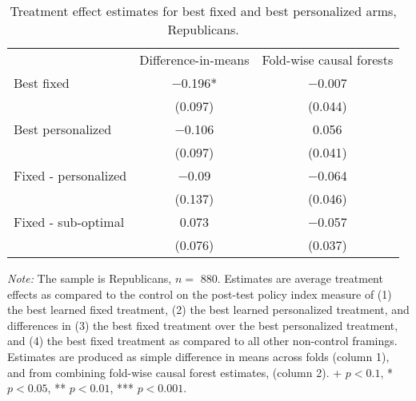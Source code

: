 \begin{table*}

\caption{Treatment effect estimates for best fixed and best personalized arms, Republicans. \label{tab:best_framing_republicans}}
\centering
\begin{threeparttable}
\begin{tabular}[t]{lcc}
\toprule
 & Difference-in-means & Fold-wise causal forests\\
\cmidrule(lr){2-2} \cmidrule(lr){3-3}
Best fixed & \num{-0.196}* & \num{-0.007}\\
 & (\num{0.097}) & (\num{0.044})\\
\addlinespace
Best personalized & \num{-0.106} & \num{0.056}\\
 & (\num{0.097}) & (\num{0.041})\\
\cmidrule(lr){2-2} \cmidrule(lr){3-3}
\addlinespace
Fixed - personalized & \num{-0.09} & \num{-0.064}\\
 & (\num{0.137}) & (\num{0.046})\\
\addlinespace
Fixed - sub-optimal & \num{0.073} & \num{-0.057}\\
 & (\num{0.076}) & (\num{0.037})\\
\bottomrule
\end{tabular}
\begin{tablenotes}
\item \footnotesize \textit{Note:} The sample is Republicans, $n = $ \num{880}. Estimates are average treatment effects as compared to the control on the post-test policy index measure of (1) the best learned fixed treatment, (2) the best learned personalized treatment, and differences in (3) the best fixed treatment over the best personalized treatment, and (4) the best fixed treatment as compared to all other non-control framings. Estimates are produced as simple difference in means across folds (column 1), and from combining fold-wise causal forest estimates, (column 2). + $p < 0.1$, * $p < 0.05$, ** $p < 0.01$, *** $p < 0.001$.
\end{tablenotes}
\end{threeparttable}
\end{table*}
